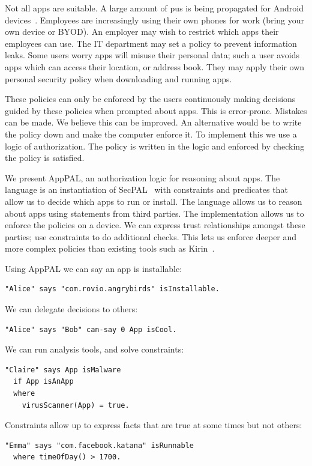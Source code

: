 \documentclass[]{scrartcl}
\newcommand{\comment}[1]{}%
\begin{document}
Not all apps are suitable.
A large amount of \ac{pus} is being propagated for Android devices~\citep{Truong:2014bi,Svajcer:2013tp}.
Employees are increasingly using their own phones for work (bring your own device or BYOD).
An employer may wish to restrict which apps their employees can use.
The IT department may set a policy to prevent information leaks.
Some users worry apps will misuse their personal data;
  such a user avoids apps which can access their location, or address book.
They may apply their own personal security policy when downloading and running apps.

These policies can only be enforced by the users continuously making decisions guided by these policies when prompted about apps.
This is error-prone.
Mistakes can be made.
We believe this can be improved.
An alternative would be to write the policy down and make the computer enforce it.
To implement this we use a logic of authorization.
The policy is written in the logic and enforced by checking the policy is satisfied.


We present AppPAL, an authorization logic for reasoning about apps.
The language is an instantiation of SecPAL~\citep{Becker:2006vh} with constraints and predicates that allow us to decide which apps to run or install.
The language allows us to reason about apps using statements from third parties.
The implementation allows us to enforce the policies on a device.
We can express trust relationships amongst these parties; use constraints to do additional checks.
This lets us enforce deeper and more complex policies than existing tools such as Kirin~\citep{Enck:2009ko}.

Using AppPAL we can say an app is installable:
\begin{lstlisting}
"Alice" says "com.rovio.angrybirds" isInstallable.
\end{lstlisting}
We can delegate decisions to others:
\begin{lstlisting}
"Alice" says "Bob" can-say 0 App isCool.
\end{lstlisting}
We can run analysis tools, and solve constraints:
\begin{lstlisting}
"Claire" says App isMalware
  if App isAnApp
  where
    virusScanner(App) = true.
\end{lstlisting}
Constraints allow up to express facts that are true at some times but not others:
\begin{lstlisting}
"Emma" says "com.facebook.katana" isRunnable
  where timeOfDay() > 1700.
\end{lstlisting}
\end{document}

